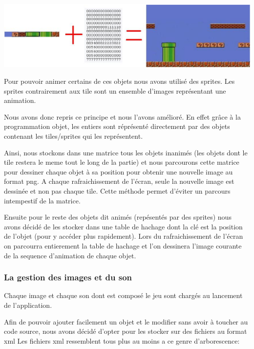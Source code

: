 			\includegraphics[width=15cm]{./Analyse/Img/tileMapping.eps}
		
			Pour pouvoir animer certains de ces objets nous avons utilisé des sprites.
			Les sprites contrairement aux tile sont un ensemble d'images représentant
			une animation.
		
			Nous avons donc repris ce principe et nous l'avons amélioré.
			En effet grâce à la programmation objet, les entiers sont réprésenté directement par des objets
			contenant les tiles/sprites qui les représentent.
			
			Ainsi, nous stockons dans une matrice tous les objets inanimés
			(les objets dont le tile restera le meme tout le long de la partie)
			et nous parcourons cette matrice pour dessiner chaque objet à sa 
			position pour obtenir une nouvelle image au format png.
			A chaque rafraichissement de l'écran, seule la nouvelle image est dessinée 
			et non pas chaque tile.
			Cette méthode permet d'éviter un parcours intempestif de la matrice.
			
			Ensuite pour le reste des objets dit animés (repésentés par des sprites)
			nous avons décidé de les stocker dans une table de hachage dont la 
			clé est la position de l'objet (pour y accéder plus rapidement).
			Lors du rafraichissement de l'écran on parcourra entierement la 
			table de hachage et l'on dessinera l'image courante de la sequence 
			d'animation de chaque objet.
		
		\subsubsection{La gestion des images et du son}
		
			Chaque image et chaque son dont est composé le jeu sont chargés au lancement de l'application.
 			
 			Afin de pouvoir ajouter facilement un objet et le modifier sans avoir à toucher au code
 			source, nous avons décidé d'opter pour les stocker sur des fichiers au format \gls{xml}
 			Les fichiers \gls{xml} ressemblent tous plus au moins a ce genre d'arborescence: 
		
